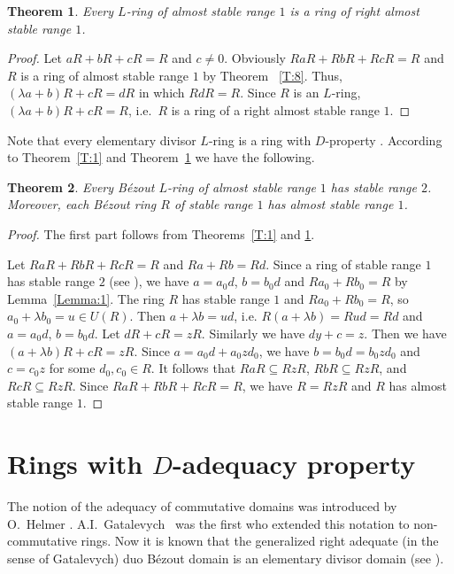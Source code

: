 \documentclass[12pt,a4paper, reqno]{amsart}
\newtheorem{theorem}{Theorem}
\begin{document}
\begin{theorem}\label{T:9}
Every  $L$-ring of almost stable range $1$ is a ring of  right almost stable range $1$.
\end{theorem}

\begin{proof}
Let $aR+bR+cR=R$ and $c\ne 0$. Obviously $RaR+RbR+RcR=R$ and  $R$ is a ring of  almost stable range $1$ by Theorem ~\ref{T:8}.
Thus, $(\lambda a +b)R+cR=dR$ in which  $RdR=R$. Since $R$ is an  $L$-ring,  $(\lambda a +b)R+cR=R$, i.e.~$R$ is a ring of a right almost stable range $1$.
\end{proof}


Note that every  elementary divisor $L$-ring  is a ring with $D$-property  \cite[Theorem~4.7.1]{12-zabavsky}.
According to Theorem~\ref{T:1} and Theorem~\ref{T:9}  we have the following.

\begin{theorem}\label{T:10}
Every  B\'ezout $L$-ring  of almost stable range $1$ has  stable range $2$.
Moreover, each B\'ezout ring $R$ of stable range $1$ has  almost  stable range $1$.
\end{theorem}

\begin{proof}
The first part follows from  Theorems~\ref{T:1} and \ref{T:9}.

Let $RaR+RbR+RcR=R$ and $Ra+Rb=Rd$. Since a  ring of stable range $1$ has  stable range $2$ (see \cite[p.\,14]{1-bass}),
we have   $a=a_0d$,  $b=b_0d$ and $Ra_0+Rb_0=R$ by Lemma~\ref{Lemma:1}. The ring  $R$ has  stable range $1$ and $Ra_0+Rb_0=R$, so  $a_0+\lambda b_0=u\in U(R)$. Then $a+\lambda b=ud$, i.e. $R(a+\lambda b)=Rud=Rd$ and $a=a_0d$,  $b=b_0d$. Let $dR+cR=zR$. Similarly we have $dy+c=z$. Then we have $(a+\lambda b)R+cR=zR$. Since $a=a_0d+a_0zd_0$,  we have $b=b_0d=b_0zd_0$ and  $c=c_0z$ for some $d_0,c_0\in R$. It follows that  $RaR\subseteq RzR$,
$RbR\subseteq RzR$, and $RcR\subseteq RzR$. Since $RaR+RbR+RcR=R$, we have   $R=RzR$ and  $R$ has  almost stable range $1$.
\end{proof}





\section{Rings with $D$-adequacy property}



The notion of the adequacy of commutative domains was  introduced by  O.~Helmer \cite{Helmer}.
A.I.~Gatalevych~\cite[Definition 1, p.\,116]{Gatalevich} was the first who extended this notation  to non-\-com\-mu\-ta\-tive  rings.
Now it is known that  the generalized right adequate (in the sense of Gatalevych)  duo B\'ezout domain is an elementary divisor  domain  (see  \cite[Theorem 2, p.\,117]{Gatalevich}).
\end{document}
